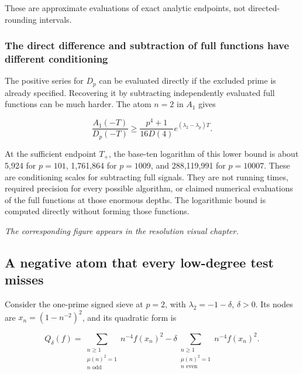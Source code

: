 These are approximate evaluations of exact analytic endpoints, not
directed-rounding intervals.

\hypertarget{v11-resolution_full-the-direct-difference-and-subtraction-of-full-functions-have-different-conditioning}{%
\subsubsection{The direct difference and subtraction of full functions
have different
conditioning}\label{v11-resolution_full-the-direct-difference-and-subtraction-of-full-functions-have-different-conditioning}}

The positive series for \(D_p\) can be evaluated directly if the
excluded prime is already specified. Recovering it by subtracting
independently evaluated full functions can be much harder. The atom
\(n=2\) in \(A_1\) gives

\[
\boxed{\frac{A_1(-T)}{D_p(-T)}
\ge\frac{p^4+1}{16D(4)}e^{(\lambda_2-\lambda_p)T}.}
\tag{RA-8}
\]

At the sufficient endpoint \(T_+\), the base-ten logarithm of this lower
bound is about 5,924 for \(p=101\), 1,761,864 for \(p=1009\), and
288,119,991 for \(p=10007\). These are conditioning scales for
subtracting full signals. They are not running times, required precision
for every possible algorithm, or claimed numerical evaluations of the
full functions at those enormous depths. The logarithmic bound is
computed directly without forming those functions.

\emph{The corresponding figure appears in the resolution visual
chapter.}

\hypertarget{v11-resolution_full-a-negative-atom-that-every-low-degree-test-misses}{%
\subsection{A negative atom that every low-degree test
misses}\label{v11-resolution_full-a-negative-atom-that-every-low-degree-test-misses}}

Consider the one-prime signed sieve at \(p=2\), with
\(\lambda_2=-1-\delta\), \(\delta>0\). Its nodes are
\(x_n=(1-n^{-2})^2\), and its quadratic form is

\[
Q_\delta(f)=\sum_{\substack{n\ge1\\\mu(n)^2=1\\n\text{ odd}}}n^{-4}f(x_n)^2
-\delta\sum_{\substack{n\ge1\\\mu(n)^2=1\\n\text{ even}}}n^{-4}f(x_n)^2.
\]

